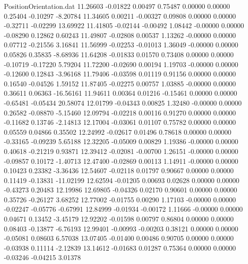 \begin{filecontents}{PositionOrientation.dat}
  11.26603   -0.01822    0.00497     0.75487    0.00000    0.00000    0.25404   -0.10297   -8.20784
  11.34605    0.00211   -0.00327     0.09808    0.00000    0.00000   -0.32711   -0.02299   13.69922
  11.41805   -0.02144   -0.00492     1.08442   -0.00000    0.00000   -0.08290    0.12862    0.60243
  11.49807   -0.02808    0.00537     1.13262   -0.00000    0.00000    0.07712   -0.21556    3.16841
  11.56999   -0.02253   -0.01013     1.36049   -0.00000    0.00000    0.05826    0.35835   -8.68936
  11.64208   -0.01833    0.01570     0.73408    0.00000    0.00000   -0.10719   -0.17220    5.79204
  11.72200   -0.02690    0.00194     1.19703   -0.00000    0.00000   -0.12600    0.12843   -3.96168
  11.79406   -0.03598    0.01119     0.91156    0.00000    0.00000    0.16540   -0.04526    1.59152
  11.87405   -0.02275    0.00757     1.03885   -0.00000    0.00000    0.36611    0.06363  -16.56161
  11.94611    0.00364    0.01216    -0.15461    0.00000    0.00000   -0.65481   -0.05434   20.58074
  12.01799   -0.04343    0.00825     1.32480   -0.00000    0.00000    0.26582   -0.08870   -5.15460
  12.09794   -0.02218    0.00116     0.91270    0.00000    0.00000   -0.11682    0.13746   -2.14813
  12.17004   -0.03061    0.01107     0.75782    0.00000    0.00000    0.05559    0.04866    0.35502
  12.24992   -0.02617    0.01496     0.78618    0.00000    0.00000   -0.33165   -0.09239    5.65188
  12.32205   -0.05009    0.00829     1.19386   -0.00000    0.00000    0.40618   -0.21219    0.93871
  12.39412   -0.02081   -0.00700     1.26151   -0.00000    0.00000   -0.09857    0.10172   -1.40713
  12.47400   -0.02869    0.00113     1.14911   -0.00000    0.00000    0.10423    0.23382   -3.36436
  12.54607   -0.02118    0.01797     0.90667    0.00000    0.00000    0.11419   -0.13831  -11.02199
  12.62594   -0.01205    0.00693     0.02628    0.00000    0.00000   -0.43273    0.20483   12.19986
  12.69805   -0.04326    0.02170     0.90601    0.00000    0.00000    0.35726   -0.26127    3.68252
  12.77002   -0.01755    0.00290     1.17103   -0.00000    0.00000   -0.02247   -0.05776   -0.67991
  12.84999   -0.01934   -0.00172     1.11666   -0.00000    0.00000    0.04671    0.13452   -3.45179
  12.92202   -0.01598    0.00797     0.86804    0.00000    0.00000    0.08403   -0.13877   -6.76193
  12.99401   -0.00993   -0.00203     0.38121    0.00000    0.00000   -0.05081    0.08603    6.57038
  13.07405   -0.01400    0.00486     0.90705    0.00000    0.00000   -0.03938    0.11114   -2.12839
  13.14612   -0.01683    0.01287     0.75364    0.00000    0.00000   -0.03246   -0.04215    3.01378

\end{filecontents}
